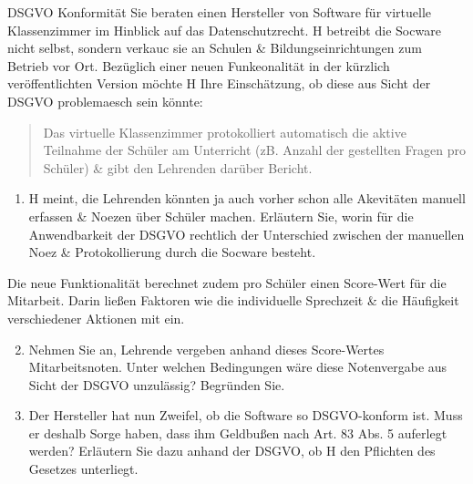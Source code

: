 \documentclass{exercisesheet}
\begin{document}
\begin{exercise}{DSGVO Konformität}
  Sie beraten einen Hersteller von Software für virtuelle Klassenzimmer im Hinblick auf das Datenschutzrecht. H betreibt die Socware nicht selbst, sondern verkauc sie an Schulen \& Bildungseinrichtungen zum Betrieb vor Ort. Bezüglich einer neuen Funkeonalität in der kürzlich veröffentlichten Version möchte H Ihre Einschätzung, ob diese aus Sicht der DSGVO problemaesch sein könnte:
  \begin{quote}
    Das virtuelle Klassenzimmer protokolliert automatisch die aktive Teilnahme der Schüler am Unterricht (zB. Anzahl der gestellten Fragen pro Schüler) \& gibt den Lehrenden darüber Bericht.
  \end{quote}

  \begin{enumerate}
    \item H meint, die Lehrenden könnten ja auch vorher schon alle Akevitäten manuell erfassen \& Noezen über Schüler machen. Erläutern Sie, worin für die Anwendbarkeit der DSGVO rechtlich der Unterschied zwischen der manuellen Noez \& Protokollierung durch die Socware besteht.
  \end{enumerate}

  Die neue Funktionalität berechnet zudem pro Schüler einen Score-Wert für die Mitarbeit. Darin ließen Faktoren wie die individuelle Sprechzeit \& die Häufigkeit verschiedener Aktionen mit ein.

  \begin{enumerate}
    \setcounter{enumi}{1}
    \item Nehmen Sie an, Lehrende vergeben anhand dieses Score-Wertes Mitarbeitsnoten. Unter welchen Bedingungen wäre diese Notenvergabe aus Sicht der DSGVO unzulässig? Begründen Sie.
    \item Der Hersteller hat nun Zweifel, ob die Software so DSGVO-konform ist. Muss er deshalb Sorge haben, dass ihm Geldbußen nach Art. 83 Abs. 5 auferlegt werden? Erläutern Sie dazu anhand der DSGVO, ob H den Pflichten des Gesetzes unterliegt.
  \end{enumerate}
\end{exercise}
\end{document}
